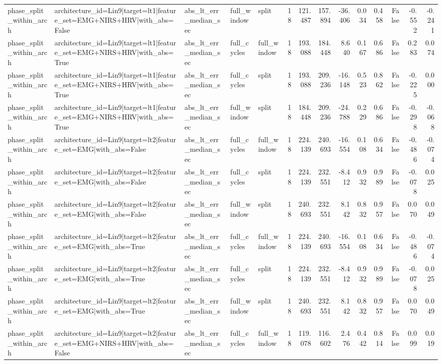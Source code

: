 \begin{table}
\begin{tabular}{lllllrrrrrrrrr}
phase_split_within_arch & architecture_id=Lin9|target=lt1|feature_set=EMG+NIRS+HRV|with_abs=False & abs_lt_err_median_sec & full_window & split & 18 & 121.487 & 157.894 & -36.406 & 0.034 & 0.458 & False & -0.552 & -0.241 \\
phase_split_within_arch & architecture_id=Lin9|target=lt1|feature_set=EMG+NIRS+HRV|with_abs=True & abs_lt_err_median_sec & full_cycles & full_window & 18 & 193.088 & 184.448 & 8.640 & 0.167 & 0.686 & False & 0.283 & 0.074 \\
phase_split_within_arch & architecture_id=Lin9|target=lt1|feature_set=EMG+NIRS+HRV|with_abs=True & abs_lt_err_median_sec & full_cycles & split & 18 & 193.088 & 209.236 & -16.148 & 0.523 & 0.862 & False & -0.225 & 0.000 \\
phase_split_within_arch & architecture_id=Lin9|target=lt1|feature_set=EMG+NIRS+HRV|with_abs=True & abs_lt_err_median_sec & full_window & split & 18 & 184.448 & 209.236 & -24.788 & 0.229 & 0.686 & False & -0.298 & -0.068 \\
phase_split_within_arch & architecture_id=Lin9|target=lt2|feature_set=EMG|with_abs=False & abs_lt_err_median_sec & full_cycles & full_window & 18 & 224.139 & 240.693 & -16.554 & 0.108 & 0.634 & False & -0.486 & -0.074 \\
phase_split_within_arch & architecture_id=Lin9|target=lt2|feature_set=EMG|with_abs=False & abs_lt_err_median_sec & full_cycles & split & 18 & 224.139 & 232.551 & -8.412 & 0.932 & 0.989 & False & -0.078 & 0.025 \\
phase_split_within_arch & architecture_id=Lin9|target=lt2|feature_set=EMG|with_abs=False & abs_lt_err_median_sec & full_window & split & 18 & 240.693 & 232.551 & 8.142 & 0.832 & 0.957 & False & 0.070 & 0.049 \\
phase_split_within_arch & architecture_id=Lin9|target=lt2|feature_set=EMG|with_abs=True & abs_lt_err_median_sec & full_cycles & full_window & 18 & 224.139 & 240.693 & -16.554 & 0.108 & 0.634 & False & -0.486 & -0.074 \\
phase_split_within_arch & architecture_id=Lin9|target=lt2|feature_set=EMG|with_abs=True & abs_lt_err_median_sec & full_cycles & split & 18 & 224.139 & 232.551 & -8.412 & 0.932 & 0.989 & False & -0.078 & 0.025 \\
phase_split_within_arch & architecture_id=Lin9|target=lt2|feature_set=EMG|with_abs=True & abs_lt_err_median_sec & full_window & split & 18 & 240.693 & 232.551 & 8.142 & 0.832 & 0.957 & False & 0.070 & 0.049 \\
phase_split_within_arch & architecture_id=Lin9|target=lt2|feature_set=EMG+NIRS+HRV|with_abs=False & abs_lt_err_median_sec & full_cycles & full_window & 18 & 119.078 & 116.602 & 2.476 & 0.442 & 0.814 & False & 0.099 & 0.019 \\

\end{tabular}
\end{table}
